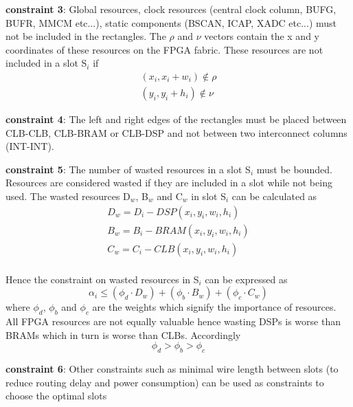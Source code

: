\documentclass[conference]{IEEEtran}
\begin{document}
\textbf{constraint 3}: Global resources, clock resources (central clock column, BUFG, BUFR, MMCM etc...), static components (BSCAN, ICAP, XADC etc...) must not be included in the rectangles. The $\rho$ and $\nu$ vectors contain the x and y coordinates of these resources on the FPGA fabric. These resources are not included in a slot S$_i$ if 
\begin{equation}
\begin{split}
(x_i, x_i+w_i) \notin \rho \\
(y_i, y_i+h_i) \notin \nu
\end{split}
\end{equation}

\textbf{constraint 4}: The left and right edges of the rectangles must be placed between CLB-CLB, CLB-BRAM or CLB-DSP and not between two interconnect columns (INT-INT).

\textbf{constraint 5}: The number of wasted resources in a slot S$_i$ must be bounded. Resources are considered wasted if they are included in a slot while not being used.  The wasted resources D$_{w}$, B$_w$ and C$_w$ in slot S$_i$ can be calculated as
\begin{equation}
\begin{split}
D_w = D_i - DSP(x_i, y_i, w_i, h_i) \\
B_w = B_i - BRAM(x_i, y_i, w_i, h_i) \\
C_w = C_i - CLB(x_i, y_i, w_i, h_i) \\ 
\end{split}
\end{equation}

Hence the constraint on wasted resources in S$_i$ can be expressed as 
\begin{equation}
\alpha_i \leq (\phi_d \cdot D_w) + (\phi_b \cdot B_w) + (\phi_c \cdot C_w)
\end{equation}
where $\phi_d$, $\phi_b$ and $\phi_c$ are the weights which signify the importance of resources. All FPGA resources are not equally valuable hence wasting DSPs is worse than BRAMs which in turn is worse than CLBs. Accordingly 
\begin{equation}
\phi_d > \phi_b > \phi_c
\end{equation}

\textbf{constraint 6}: Other constraints such as minimal wire length between slots (to reduce routing delay and power consumption) can be used as constraints to choose the optimal slots \\
\end{document}
